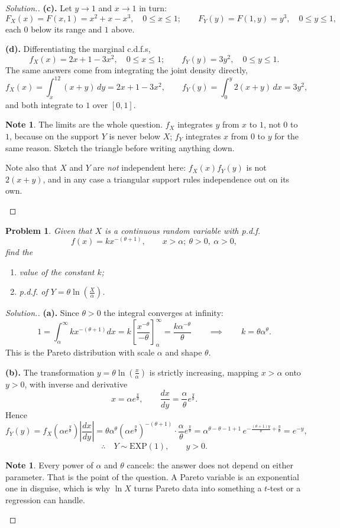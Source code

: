 \documentclass[12pt,a4paper]{report}
\theoremstyle{definition}
\newtheorem{note}[thm]{Note}
\theoremstyle{plain}
\newtheorem{problemx}{Problem}[section]
\newenvironment{problem}{\begin{problemx}}{\end{problemx}}
\newenvironment{solution}
  {\renewcommand{\qedsymbol}{}\begin{proof}[\textit{Solution}.]}
  {\end{proof}}
\begin{document}
\begin{solution}
\textbf{(c).} Let $y\to1$ and $x\to1$ in turn:
\[F_X(x)=F(x,1)=x^2+x-x^3,\quad 0\leq x\leq1;\qquad
F_Y(y)=F(1,y)=y^3,\quad 0\leq y\leq1,\]
each $0$ below its range and $1$ above.

\textbf{(d).} Differentiating the marginal c.d.f.s,
\[f_X(x)=2x+1-3x^2,\quad 0\leq x\leq1;\qquad f_Y(y)=3y^2,\quad 0\leq y\leq1.\]
The same answers come from integrating the joint density directly,
\[f_X(x)=\int_x^12(x+y)\,dy=2x+1-3x^2,\qquad
f_Y(y)=\int_0^y2(x+y)\,dx=3y^2,\]
and both integrate to $1$ over $[0,1]$.

\begin{note}
The limits are the whole question. $f_X$ integrates $y$ from $x$ to $1$, not $0$
to $1$, because on the support $Y$ is never below $X$; $f_Y$ integrates $x$ from
$0$ to $y$ for the same reason. Sketch the triangle before writing anything down.

Note also that $X$ and $Y$ are \emph{not} independent here: $f_X(x)f_Y(y)$ is not
$2(x+y)$, and in any case a triangular support rules independence out on its own.
\end{note}
\end{solution}

\begin{problem}
Given that $X$ is a continuous random variable with p.d.f.
\[f(x)=kx^{-(\theta+1)},\qquad x>\alpha;\ \theta>0,\ \alpha>0,\]
find the
\begin{enumerate}
\item[(a).] value of the constant $k$;
\item[(b).] p.d.f. of $Y=\theta\ln\left(\frac{X}{\alpha}\right)$.
\end{enumerate}
\end{problem}

\begin{solution}
\textbf{(a).} Since $\theta>0$ the integral converges at infinity:
\[1=\int_\alpha^\infty kx^{-(\theta+1)}dx
=k\left[\frac{x^{-\theta}}{-\theta}\right]_\alpha^\infty
=\frac{k\alpha^{-\theta}}{\theta}
\qquad\implies\qquad k=\theta\alpha^\theta.\]
This is the Pareto distribution with scale $\alpha$ and shape $\theta$.

\textbf{(b).} The transformation $y=\theta\ln\left(\frac{x}{\alpha}\right)$ is
strictly increasing, mapping $x>\alpha$ onto $y>0$, with inverse and derivative
\[x=\alpha e^{\frac{y}{\theta}},\qquad
\frac{dx}{dy}=\frac{\alpha}{\theta}e^{\frac{y}{\theta}}.\]
Hence
\[f_Y(y)=f_X\!\left(\alpha e^{\frac{y}{\theta}}\right)\left|\frac{dx}{dy}\right|
=\theta\alpha^\theta\left(\alpha e^{\frac{y}{\theta}}\right)^{-(\theta+1)}
\cdot\frac{\alpha}{\theta}e^{\frac{y}{\theta}}
=\alpha^{\theta-\theta-1+1}\,
e^{-\frac{(\theta+1)y}{\theta}+\frac{y}{\theta}}
=e^{-y},\]
\[\therefore\quad Y\sim\text{EXP}(1),\qquad y>0.\]

\begin{note}
Every power of $\alpha$ and $\theta$ cancels: the answer does not depend on either
parameter. That is the point of the question. A Pareto variable is an exponential
one in disguise, which is why $\ln X$ turns Pareto data into something a
$t$-test or a regression can handle.
\end{note}
\end{solution}
\end{document}
